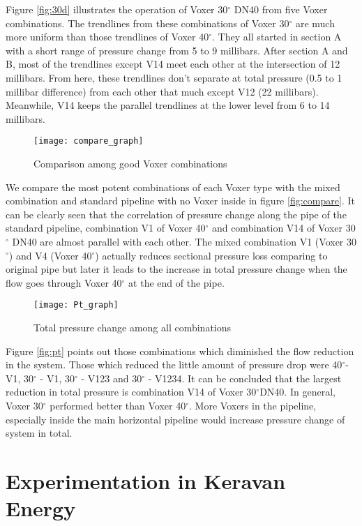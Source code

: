 Figure \vref{fig:30d} illustrates the operation of Voxer 30$^{\circ}$ DN40 from five Voxer combinations. The trendlines from these combinations of Voxer 30$^{\circ}$ are much more uniform than those trendlines of Voxer 40$^{\circ}$. They all started in section A with a short range of pressure change from 5 to 9 millibars. After section A and B, most of the trendlines except V14 meet each other at the intersection of 12 millibars. From here, these trendlines don't separate at total pressure (0.5 to 1 millibar difference) from each other that much except V12 (22 millibars). Meanwhile, V14 keeps the parallel trendlines at the lower level from 6 to 14 millibars.
\begin{figure}[h!]
  \centering
  \texttt{[image: compare\_graph]}
  \caption{ Comparison among good Voxer combinations }
  \label{fig:compare}
\end{figure}

We compare the most potent combinations of each Voxer type with the mixed combination and standard pipeline with no Voxer inside in figure \vref{fig:compare}. It can be clearly seen that the correlation of pressure change along the pipe of the standard pipeline, combination V1 of Voxer 40$^{\circ}$ and combination V14 of Voxer 30 $^{\circ}$ DN40 are almost parallel with each other. The mixed combination V1 (Voxer 30$^{\circ}$) and V4 (Voxer 40$^{\circ}$) actually reduces sectional pressure loss comparing to original pipe but later it leads to the increase in total pressure change when the flow goes through Voxer 40$^{\circ}$ at the end of the pipe. 

\begin{figure}[h!]
  \centering
  \texttt{[image: Pt\_graph]}
  \caption{ Total pressure change among all combinations}
  \label{fig:pt}
\end{figure}

Figure \vref{fig:pt} points out those combinations which diminished the flow reduction in the system. Those which reduced the little amount of pressure drop were 40$^{\circ}$- V1, 30$^{\circ}$ - V1, 30$^{\circ}$ - V123 and 30$^{\circ}$ - V1234. It can be concluded that the largest reduction in total pressure is combination V14 of Voxer 30$^{\circ}$DN40. In general, Voxer 30$^{\circ}$ performed better than Voxer 40$^{\circ}$. More Voxers in the pipeline, especially inside the main horizontal pipeline would increase pressure change of system in total.  

\section{Experimentation in Keravan Energy}

